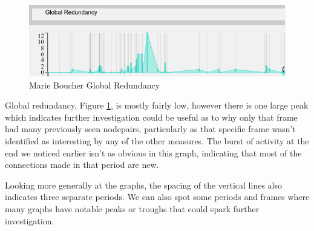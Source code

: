 \begin{figure}[H]
  \begin{center}
  \includegraphics[trim={0 0 0 0}, width=140mm]{./Figures/marieBoucherGlobalRedundancy.png}
  \caption{Marie Boucher Global Redundancy}
  \label{fig:marieBoucherGlobalRedundancy}
  \end{center}
\end{figure}
Global redundancy, Figure \ref{fig:marieBoucherGlobalRedundancy}, is mostly fairly low, however there is one large peak which indicates further investigation could be useful as to why only that frame had many previously seen nodepairs, particularly as that specific frame wasn't identified as interesting by any of the other measures. The burst of activity at the end we noticed earlier isn't as obvious in this graph, indicating that most of the connections made in that period are new.
    
Looking more generally at the graphs, the spacing of the vertical lines also indicates three separate periods. We can also spot some periods and frames where many graphs have notable peaks or troughs that could spark further investigation.
    
